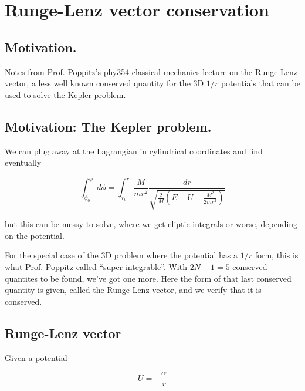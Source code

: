 
%

\chapter{Runge-Lenz vector conservation}
\label{chap:RungeLenz}
{}
\date{Feb 11, 2012}

\beginArtWithToc

\section{Motivation.}

Notes from Prof. Poppitz's phy354 classical mechanics lecture on the Runge-Lenz vector, a less well known conserved quantity for the 3D $1/r$ potentials that can be used to solve the Kepler problem.

\section{Motivation: The Kepler problem.}

We can plug away at the Lagrangian in cylindrical coordinates and find eventually

\begin{equation}\label{eqn:RungeLenz:10}
\int_{\phi_0}^\phi d\phi = \int_{r_0}^r \frac{M}{m r^2} \frac{dr}{\sqrt{\frac{2}{M} ( E - U + \frac{M^2}{2 m r^2}) }}
\end{equation}

but this can be messy to solve, where we get eliptic integrals or worse, depending on the potential.

For the special case of the 3D problem where the potential has a $1/r$ form, this is what Prof. Poppitz called ``super-integrable''.  With $2N - 1 = 5$ conserved quantites to be found, we've got one more.  Here the form of that last conserved quantity is given, called the Runge-Lenz vector, and we verify that it is conserved.

\section{Runge-Lenz vector}

Given a potential

\begin{equation}\label{eqn:RungeLenz:30}
U = -\frac{\alpha}{r}
\end{equation}

